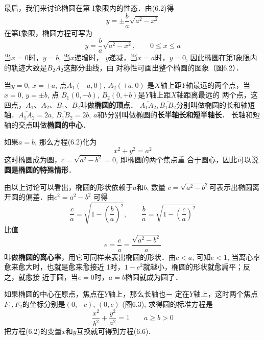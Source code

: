 最后，我们来讨论椭圆在第
I象限内的性态．由(6.2)得
\[y=\pm\frac{b}{a}\sqrt{a^2-x^2}\]
在第I象限，椭圆方程可写为
\[y=\frac{b}{a}\sqrt{a^2-x^2},\qquad 0\le x\le a\]
当$x=0$时，$y=b$, 当$x$递增时，
$y$递减，当$x=a$时，$y=0$, 
因此椭圆在第I象限内的轨迹大致是$B_2A_2$这部分曲线，由
对称性可画出整个椭圆的图象（图6.2）．

\begin{figure}[htp]
    \centering
    \caption{}
\end{figure}

当$y=0$, $x=\pm a$, 点$A_1(-a,0)$, $A_2(+a,0)$
是$X$轴上距$Y$轴最远的两个点，当$x=0$, $y=\pm b$, 点
$B_1(0,-b)$, $B_2(0,+b)$是$Y$轴上距$X$轴距离最远的
两个点，这四点，$A_1$、$A_2$、$B_1$、$B_2$叫做\textbf{椭圆的顶点}．
$\overline{A_1A_2},\overline{B_1B_2}$分别叫做椭圆的长和轴短轴．$\overline{A_1A_2}=2a$, 
$\overline{B_1B_2}=2b$, $a$和$b$分别叫做椭圆的\textbf{长半轴长和短半轴长}．
长轴和短轴的交点叫做\textbf{椭圆的中心}．

如果$a=b$, 那么方程(6.2)化为
\[x^2+y^2=a^2\]
这时椭圆成为圆，$c=\sqrt{a^2-b^2}=0$, 即椭圆的两个焦点重
合于圆心，因此可以说\textbf{圆是椭圆的特殊情形}．

由以上讨论可以看出，椭圆的形状依赖于$a$和$b$, 数量
$c=\sqrt{a^2-b^2}$可表示出椭圆离开圆的偏差．由$c^2=a^2-b^2$
可得
\[\frac{c}{a}=\sqrt{1-\left(\frac{b}{a}\right)^2},\qquad \frac{b}{a}=\sqrt{1-\left(\frac{c}{a}\right)^2}\]
比值
\[e=\frac{c}{a}=\frac{\sqrt{a^2-b^2}}{a}\]
叫做\textbf{椭圆的离心率}，用它可同样来表出椭圆的形状．由$c<
a$, 可知$e<1$, 当离心率愈来愈大时，也就是愈来愈接近
1时，$1-e^2$就越小，椭圆的形状就愈扁平；反之，就愈接
近于圆，当$e=0$时，$a=b$椭圆就成为圆了．

如果椭圆的中心在原点，焦点在$Y$轴上，那么长轴也－
定在$Y$轴上，这时两个焦点$F_1,F_2$的坐标分别是$(0,-c)$,
$(0,c)$ (图6.3), 求得圆的标准方程是
\begin{equation}
    \boxed{\frac{x^2}{b^2}+\frac{y^2}{a^2}=1}\qquad a\ge b>0
\end{equation}
把方程(6.2)的变量$x$和$y$互换就可得到方程(6.6).

